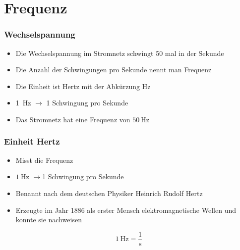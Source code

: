 
\section{Frequenz}
\label{section:frequenz}
\begin{frame}%

\frametitle{Wechselspannung}
\begin{itemize}
  \item Die Wechselspannung im Stromnetz schwingt 50 mal in der Sekunde
  \item Die Anzahl der Schwingungen pro Sekunde nennt man Frequenz
  \item Die Einheit ist Hertz mit der Abkürzung $\text{Hz}$
  \item \qty{1}{\hertz} $\rightarrow$ 1 Schwingung pro Sekunde
  \item Das Stromnetz hat eine Frequenz von $50\ \text{Hz}$
  \end{itemize}
\end{frame}

\begin{frame}
\frametitle{Einheit Hertz}
\begin{itemize}
  \item Misst die Frequenz
  \item $1\ \text{Hz}$ $\rightarrow$1 Schwingung pro Sekunde
  \item Benannt nach dem deutschen Physiker Heinrich Rudolf Hertz
  \item Erzeugte im Jahr 1886 als erster Mensch elektromagnetische Wellen und konnte sie nachweisen
  \end{itemize}
    \pause
    $$1 \ \text{Hz} = \dfrac{1}{\text{s}}$$



\end{frame}

\begin{frame}
\end{frame}

